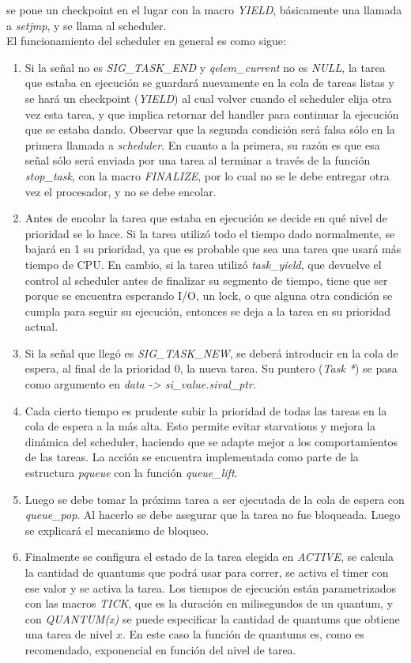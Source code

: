 \documentclass[a4paper]{article}
\begin{document}
se pone un checkpoint en el lugar con la macro \textit{YIELD},
básicamente una llamada a \textit{setjmp}, y se llama al scheduler. \\
El funcionamiento del scheduler en general es como sigue:
\begin{enumerate}
    \item Si la señal no es \textit{SIG\_TASK\_END} y
    \textit{qelem\_current} no es \textit{NULL}, la tarea que estaba
    en ejecución se guardará nuevamente en la cola de tareas listas
    y se hará un checkpoint (\textit{YIELD}) al cual volver cuando
    el scheduler elija otra vez esta tarea, y que implica retornar
    del handler para continuar la ejecución que se estaba dando.
    Observar que la segunda condición será falsa sólo en la primera
    llamada a \textit{scheduler}. En cuanto a la primera, su razón es
    que esa señal sólo será enviada por una tarea al terminar a
    través de la función \textit{stop\_task}, con la macro
    \textit{FINALIZE}, por lo cual no se le debe entregar otra
    vez el procesador, y no se debe encolar.
    \item Antes de encolar la tarea que estaba en ejecución se decide
    en qué nivel de prioridad se lo hace. Si la tarea utilizó todo
    el tiempo dado normalmente, se bajará en 1 su prioridad, ya que
    es probable que sea una tarea que usará más tiempo de CPU.
    En cambio, si la tarea utilizó \textit{task\_yield}, que devuelve
    el control al scheduler antes de finalizar su segmento de tiempo,
    tiene que ser porque se encuentra esperando I/O, un lock, o que
    alguna otra condición se cumpla para seguir su ejecución,
    entonces se deja a la tarea en su prioridad actual.
    \item Si la señal que llegó es \textit{SIG\_TASK\_NEW}, se deberá
    introducir en la cola de espera, al final de la prioridad 0, la
    nueva tarea. Su puntero (\textit{Task *}) se pasa como argumento
    en \textit{data -> si\_value.sival\_ptr}.
    \item Cada cierto tiempo es prudente subir la prioridad de todas
    las tareas en la cola de espera a la más alta. Esto permite
    evitar starvations y mejora la dinámica del scheduler, haciendo
    que se adapte mejor a los comportamientos de las tareas. La
    acción se encuentra implementada como parte de la estructura
    \textit{pqueue} con la función \textit{queue\_lift}.
    \item Luego se debe tomar la próxima tarea a ser ejecutada de la
    cola de espera con \textit{queue\_pop}. Al hacerlo se debe
    asegurar que la tarea no fue bloqueada. Luego se explicará el
    mecanismo de bloqueo.
    \item Finalmente se configura el estado de la tarea elegida en
    \textit{ACTIVE}, se calcula la cantidad de quantums que podrá
    usar para correr, se activa el timer con ese valor y se activa
    la tarea. Los tiempos de ejecución están parametrizados con
    las macros \textit{TICK}, que es la duración en milisegundos
    de un quantum, y con \textit{QUANTUM(x)} se puede especificar
    la cantidad de quantums que obtiene una tarea de nivel $x$.
    En este caso la función de quantums es, como es recomendado,
    exponencial en función del nivel de tarea.
\end{enumerate}
\end{document}
